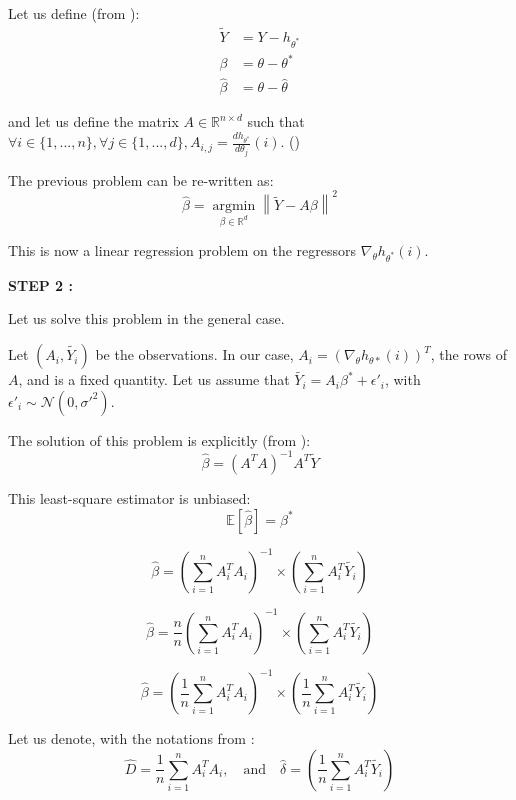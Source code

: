 Let us define (from \cite{ruckstuhl2010introduction}): \\
\begin{align*}
\tilde{Y} &= Y - h_{\theta^*} \\
\beta &= \theta - \theta^* \\
\hat{\beta} &= \theta - \hat{\theta}
\end{align*}

and let us define the matrix $A \in \mathbb{R} ^{n \times d }$ such that $\forall i \in \{ 1, ..., n\}, \forall j \in \{1, ..., d\}, A_{i, j} = \frac{dh_{\theta^*}}{d\theta_j}(i)$.
(\cite{ruckstuhl2010introduction})

The previous problem can be re-written as:
\[
\hat{\beta} =  \underset{\beta \in \mathbb{R}^d}{\operatorname{argmin}}  \left\lVert \tilde{Y} - A \beta \right\rVert ^2
\]

This is now a  linear regression problem on the regressors $\nabla_\theta h_{\theta^*}(i)$.



\textbf{STEP 2 :}\\
\label{step:step2}



Let us solve this problem in the general case.

Let $(A_i, \tilde{Y_i})$ be the observations.
In our case, $A_i = (\nabla_\theta h_{\theta*} (i))^T$, the rows of $A$,  and is a fixed quantity.  
Let us assume that $\tilde{Y_i} = A_i \beta ^* + \epsilon'_i $, with $\epsilon'_i \sim \mathcal{N}(0, \sigma'^2)$.

The solution of this problem is explicitly (from \cite*{powellasymptoticsforleastsquares}):
\[
\hat{\beta } = (A^T A ) ^{-1} A^T \tilde{Y}
\]

This least-square estimator is unbiased:
\[
\mathbb{E}[\hat{\beta}] = \beta^*
\]


\[
\hat {\beta } = \left(  \sum_{i=1}^{n}   A_i ^T A_i \right) ^{-1}    \times \left(  \sum_{i=1}^{n} A_i ^T \tilde{Y_i } \right)
\]

\[
\hat {\beta } =\frac{n}{n} \left(  \sum_{i=1}^{n}   A_i ^T A_i \right) ^{-1}    \times \left(  \sum_{i=1}^{n} A_i ^T \tilde{Y_i } \right)
\]

\[
\hat {\beta } = \left( \frac{1}{n} \sum_{i=1}^{n}   A_i ^T A_i \right) ^{-1}    \times \left( \frac{1}{n} \sum_{i=1}^{n} A_i ^T \tilde{Y_i } \right)
\]

Let us denote, with the notations from \cite{powellasymptoticsforleastsquares}:
\[
\hat{D}  = \frac{1}{n} \sum_{i=1}^{n}   A_i ^T A_i , \quad \text{and} \quad \hat{\delta}  = \left( \frac{1}{n} \sum_{i=1}^{n} A_i ^T \tilde{Y_i } \right)
\]

